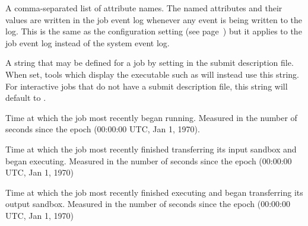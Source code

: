 \begin{description}
\label{JobAdInformationAttrs-job-attribute}
\item[\AdAttr{JobAdInformationAttrs}:] A comma-separated list
of attribute names.  The named attributes and their values are written
in the job event log whenever any event is being written to the log.
This is the same as the configuration setting
 (see
page~\pageref{param:EventLogJobAdInformationAttrs}) but it applies to
the job event log instead of the system event log.

\label{JobDescription-job-attribute}
\item[\AdAttr{JobDescription}:]  A string that may be defined for
a job by setting  in the submit description file.
When set, tools which display the executable such as 
will instead use this string.
For interactive jobs that do not have a submit description file,
this string will default to .

\label{JobCurrentStartDate-job-attribute}
\item[\AdAttr{JobCurrentStartDate}:]  Time at which the job most recently began
running.  Measured in the
number of seconds since the epoch (00:00:00 UTC, Jan 1, 1970).  

\label{JobCurrentStartExecutingDate-job-attribute}
\item[\AdAttr{JobCurrentStartExecutingDate}:]  Time at which the job most recently finished
transferring its input sandbox and began executing.  Measured in the
number of seconds since the epoch (00:00:00 UTC, Jan 1, 1970)

\label{JobCurrentStartTransferOutputDate-job-attribute}
\item[\AdAttr{JobCurrentStartTransferOutputDate}:]  Time at which the job most recently finished
executing and began transferring its output sandbox.  Measured in the
number of seconds since the epoch (00:00:00 UTC, Jan 1, 1970)



\end{description}
